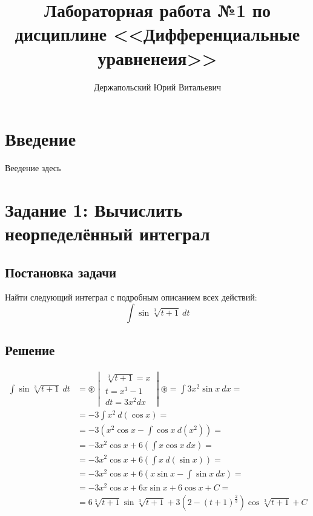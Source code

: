 \documentclass[14pt, a4paper, titlepage, fleqn]{extarticle}
\title{Лабораторная работа №1 по дисциплине <<Дифференциальные уравненеия>>}
\author{Держапольский Юрий Витальевич}
\begin{document}
    \maketitle

    \tableofcontents

    \pagebreak

    \section{Введение}
        Веедение здесь

    \pagebreak

    \section{Задание 1: Вычислить неорпеделённый интеграл}
        \subsection{Постановка задачи}
            Найти следующий интеграл с подробным описанием всех действий:
            \[ \int \sin{ \sqrt[3]{t+1} } ~ dt \]
        
        \subsection{Решение}
        \[
            \begin{split}
                \int \sin{ \sqrt[3]{t+1} } ~ dt &= \circledast
                \begin{vmatrix}
                    \sqrt[3]{t+1} = x \\
                    t = x^3 - 1 \\
                    dt = 3x^2dx
                \end{vmatrix}
                \circledast = \int 3x^2\sin{x} ~ dx = \\
                &= -3 \int x^2 ~ d(\cos{x}) = \\
                &= -3 \left( 
                    x^2\cos{x} - \int \cos{x} ~ d \left(x^2\right) 
                \right) = \\
                &= -3x^2\cos{x} + 6\left(\int x \cos{x} ~ dx\right) = \\
                &= -3x^2\cos{x} + 6\left(\int x ~ d(\sin{x})\right) = \\
                &= -3x^2\cos{x} + 6\left(x\sin{x} - \int \sin{x} ~ dx \right)=\\
                &= -3x^2\cos{x} + 6x\sin{x} + 6\cos{x} + C =\\
                &= 6 \sqrt[3]{t+1} \sin{\sqrt[3]{t+1}} + 
                    3\left(2 - (t+1)^{\frac{2}{3}}\right) \cos{\sqrt[3]{t+1}}+C
            \end{split}    
        \]
\end{document}
